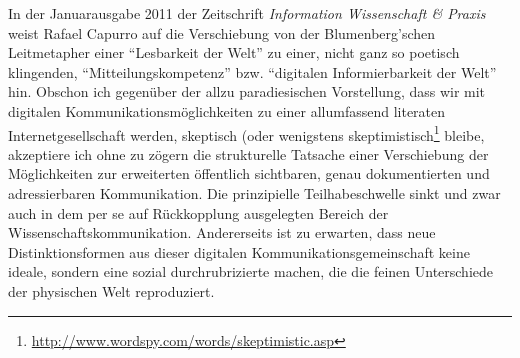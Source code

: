 \documentclass[output=paper]{langscibook}
\begin{document}
In der Januarausgabe 2011 der Zeitschrift \emph{Information Wissenschaft
\& Praxis} weist Rafael Capurro auf die Verschiebung von der
Blumenberg'schen Leitmetapher einer \enquote{Lesbarkeit der Welt} zu
einer, nicht ganz so poetisch klingenden, \enquote{Mitteilungskompetenz}
bzw. \enquote{digitalen Informierbarkeit der Welt} hin. Obschon ich
gegenüber der allzu paradiesischen Vorstellung, dass wir mit digitalen
Kommunikationsmöglichkeiten zu einer allumfassend literaten
Internetgesellschaft werden, skeptisch (oder wenigstens
skeptimistisch\footnote{\url{http://www.wordspy.com/words/skeptimistic.asp}}
bleibe, akzeptiere ich ohne zu zögern die strukturelle Tatsache einer
Verschiebung der Möglichkeiten zur erweiterten öffentlich sichtbaren,
genau dokumentierten und adressierbaren Kommunikation. Die prinzipielle
Teilhabeschwelle sinkt und zwar auch in dem per se auf Rückkopplung
ausgelegten Bereich der Wissenschaftskommunikation. Andererseits ist zu
erwarten, dass neue Distinktionsformen aus dieser digitalen
Kommunikationsgemeinschaft keine ideale, sondern eine sozial
durchrubrizierte machen, die die feinen Unterschiede der physischen Welt
reproduziert.
\end{document}
